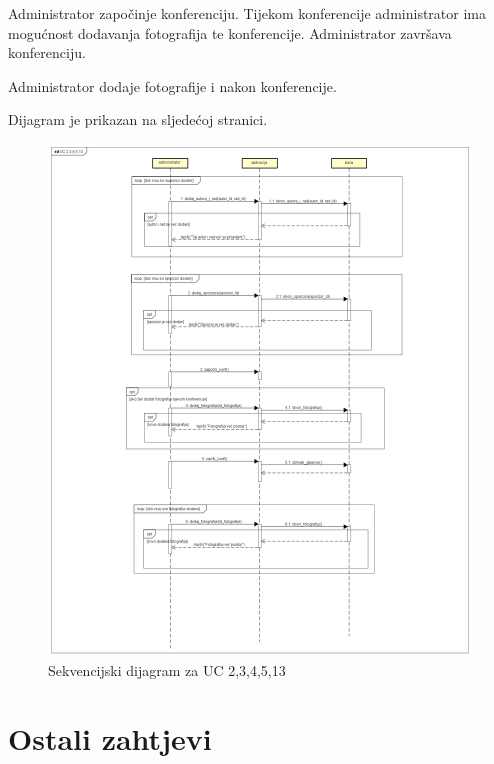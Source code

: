 				Administrator započinje konferenciju. Tijekom konferencije administrator ima mogućnost dodavanja fotografija te konferencije. Administrator završava konferenciju. 

				Administrator dodaje fotografije i nakon konferencije.

				Dijagram je prikazan na sljedećoj stranici.
				\eject

				\begin{figure}[H]
					\includegraphics[scale=0.3]{slike/sekv2.png}%
					\centering
					\caption{Sekvencijski dijagram za UC 2,3,4,5,13}
					\label{fig:promjene2}
				\end{figure}
				\eject
	
		\section{Ostali zahtjevi}
		
		 
